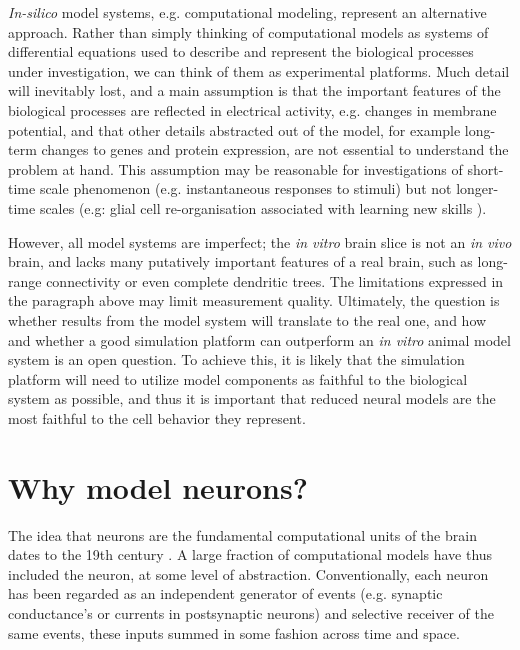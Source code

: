 \emph{In-silico} model systems, e.g. computational modeling, represent an alternative approach.
Rather than simply thinking of computational models as systems of differential equations used to describe and represent the biological processes under investigation, we can think of them as experimental platforms.
Much detail will inevitably lost, and a main assumption is that the important features of the biological processes are reflected in electrical activity, e.g. changes in membrane potential, and that other details abstracted out of the model, for example long-term changes to genes and protein expression, are not essential to understand the problem at hand.
This assumption may be reasonable for investigations of short-time scale phenomenon (e.g. instantaneous responses to stimuli) but not longer-time scales (e.g: glial cell re-organisation associated with learning new skills \citep{draganski2008training}).

However, all model systems are imperfect; the \emph{in vitro} brain slice is not an \emph{in vivo} brain, and lacks many putatively important features of a real brain, such as long-range connectivity or even complete dendritic trees.
The limitations expressed in the paragraph above may limit measurement quality.
Ultimately, the question is whether results from the model system will translate to the real one, and how and whether a good simulation platform can outperform an \emph{in vitro} animal model system is an open question.
To achieve this, it is likely that the simulation platform will need to utilize model components as faithful to the biological system as possible, and thus it is important that reduced neural models are the most faithful to the cell behavior they represent. 

\section{Why model neurons?}
The idea that neurons are the fundamental computational units of the brain dates to the 19th century \citep{shepherd2015foundations,jones1999golgi}.
A large fraction of computational models have thus included the neuron, at some level of abstraction.  
Conventionally, each neuron has been regarded as an independent generator of events (e.g. synaptic conductance's or currents in postsynaptic neurons) and selective receiver of the same events, these inputs summed in some fashion across time and space. 

